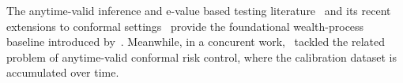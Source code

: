 \documentclass{uai2026} %
\newcommand{\1}{\mathbf{1}}
\begin{document}
The anytime-valid inference and e-value based testing literature~\citep{grunwald2020safe,vovk2021values,ramdas2023game,howard2021time} and its recent extensions to conformal settings~\citep{gauthier2025values,vovk2025conformal,balinsky2024enhancing} provide the foundational wealth-process baseline introduced by~\citet{gauthier2025values}. Meanwhile, in a concurent work,~\citet{hultberg2026anytime} tackled the related problem of anytime-valid conformal risk control, where the calibration dataset is accumulated over time.




\end{document}
